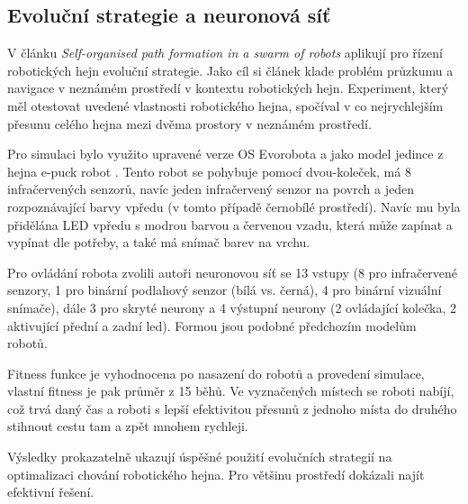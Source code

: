 \subsection*{Evoluční strategie a neuronová síť}
V článku \textit{Self-organised path formation in a swarm of robots} \citep{sperati2011self} aplikují pro řízení robotických hejn evoluční strategie. Jako cíl si článek klade problém průzkumu a navigace v neznámém prostředí v kontextu robotických hejn. Experiment, který měl otestovat uvedené vlastnosti robotického hejna, spočíval v co nejrychlejším přesunu celého hejna mezi dvěma prostory v neznámém prostředí. 
\par 
Pro simulaci bylo využito upravené verze OS Evorobota a jako model jedince z hejna e-puck robot \citep{mondada2009puck}. Tento robot se pohybuje pomocí dvou-koleček, má 8 infračervených senzorů, navíc jeden infračervený senzor na povrch a jeden rozpoznávající barvy vpředu (v tomto případě černobílé prostředí). Navíc mu byla přidělána LED vpředu s modrou barvou a červenou vzadu, která může zapínat a vypínat dle potřeby, a také má snímač barev na vrchu. 
\par
Pro ovládání robota zvolili autoři neuronovou síť se 13 vstupy (8 pro infračervené senzory, 1 pro binární podlahový senzor (bílá vs. černá), 4 pro binární vizuální snímače), dále 3 pro skryté neurony a 4 výstupní neurony (2 ovládající kolečka, 2 aktivující přední a zadní led). Formou jsou podobné předchozím modelům robotů. 
\par
Fitness funkce je vyhodnocena po nasazení do robotů a provedení simulace, vlastní fitness je pak průměr z 15 běhů. Ve vyznačených místech se roboti nabíjí, což trvá daný čas a roboti s lepší efektivitou přesunů z jednoho místa do druhého stihnout cestu tam a zpět mnohem rychleji.
\par 
Výsledky prokazatelně ukazují úspěšné použití evolučních strategií na optimalizaci chování robotického hejna. Pro většinu prostředí dokázali najít efektivní řešení.


